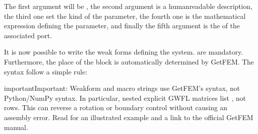 \documentclass[letterpaper,10pt,english]{sphinxmanual}
\begin{document}
\begin{sphinxVerbatim}[commandchars=\\\{\}]
        
        
\end{sphinxVerbatim}

\sphinxAtStartPar
The first argument will be , the
second argument is a human\sphinxhyphen{}readable description, the third one set the
kind of the parameter, the fourth one is the mathematical expression
defining the parameter, and finally the fifth argument is the  of
the associated port.

\sphinxAtStartPar
It is now possible to write the weak forms defining the system.  are mandatory. Furthermore, the place of the block
is automatically determined by GetFEM. The syntax follow a simple rule:

\begin{sphinxadmonition}{important}{Important:}
\sphinxAtStartPar
Weak\sphinxhyphen{}form and macro strings use GetFEM’s  syntax,
not Python/NumPy syntax. In particular, nested explicit
GWFL matrices list , not rows. This can reverse
a rotation or boundary control without causing an assembly error.
Read {\hyperref[\detokenize{getfem_gwfl::doc}]{}} for an illustrated example and
a link to the official GetFEM manual.
\end{sphinxadmonition}
\end{document}

